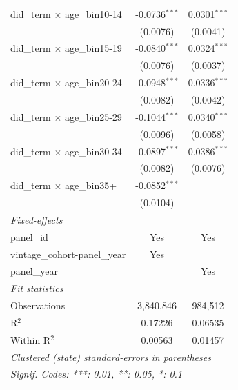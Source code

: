 \begin{tabular}{lcc}
   did\_term $\times$ age\_bin10-14    & -0.0736$^{***}$ & 0.0301$^{***}$\\   
                                       & (0.0076)        & (0.0041)\\   
   did\_term $\times$ age\_bin15-19    & -0.0840$^{***}$ & 0.0324$^{***}$\\   
                                       & (0.0076)        & (0.0037)\\   
   did\_term $\times$ age\_bin20-24    & -0.0948$^{***}$ & 0.0336$^{***}$\\   
                                       & (0.0082)        & (0.0042)\\   
   did\_term $\times$ age\_bin25-29    & -0.1044$^{***}$ & 0.0340$^{***}$\\   
                                       & (0.0096)        & (0.0058)\\   
   did\_term $\times$ age\_bin30-34    & -0.0897$^{***}$ & 0.0386$^{***}$\\   
                                       & (0.0082)        & (0.0076)\\   
   did\_term $\times$ age\_bin35+      & -0.0852$^{***}$ &   \\   
                                       & (0.0104)        &   \\   
   \midrule
   \emph{Fixed-effects}\\
   panel\_id                           & Yes             & Yes\\  
   vintage\_cohort-panel\_year         & Yes             & \\  
   panel\_year                         &                 & Yes\\  
   \midrule
   \emph{Fit statistics}\\
   Observations                        & 3,840,846       & 984,512\\  
   R$^2$                               & 0.17226         & 0.06535\\  
   Within R$^2$                        & 0.00563         & 0.01457\\  
   \midrule \midrule
   \multicolumn{3}{l}{\emph{Clustered (state) standard-errors in parentheses}}\\
   \multicolumn{3}{l}{\emph{Signif. Codes: ***: 0.01, **: 0.05, *: 0.1}}\\
\end{tabular}
\par\endgroup


